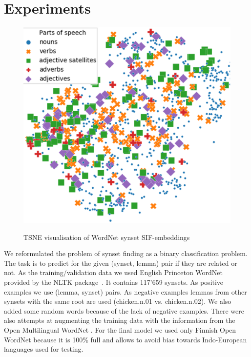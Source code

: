 \documentclass[11pt,a4paper]{article}
\begin{document}
\section{Experiments}
\begin{figure}
	
	\centering
	\small
	\includegraphics[scale=0.5]{wordnet-pos3}\\
	
	\caption{TSNE visualisation of WordNet synset SIF-embeddings}
	\label{wordnet-pos}
\end{figure}
We reformulated the problem of synset finding as a binary classification problem. The task is to predict for the given (synset, lemma) pair if they are related or not. As the training/validation data we used English Princeton WordNet \cite{wordnet} provided by the NLTK package~\cite{nltk}. It contains 117'659 synsets. As positive examples we use (lemma, synset) pairs. As negative examples lemmas from other synsets with the same root are used (chicken.n.01 vs. chicken.n.02). We also added some random words because of the lack of negative examples. There were also attempts at augmenting the training data with the information from the Open Multilingual WordNet \cite{bond-wordnet}. For the final model we used only Finnish Open WordNet because it is 100\% full and allows to avoid bias towards Indo-European languages used for testing.
\end{document}

